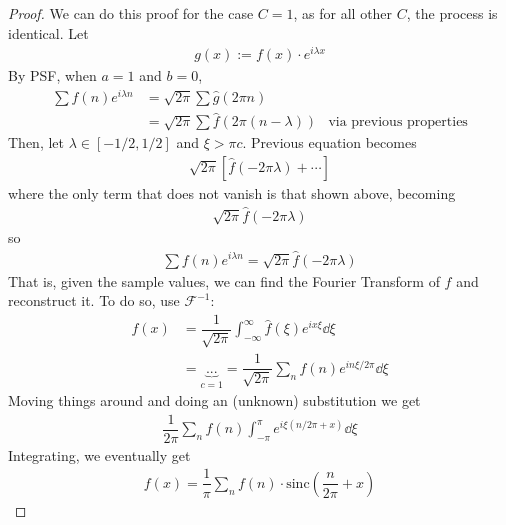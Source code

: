 \begin{proof}
    We can do this proof for the case $C=1$, as for all other $C$, the process is identical. Let
    \begin{align}
        g(x) := f(x) \cdot e^{i\lambda x}    
    \end{align}
    By PSF, when $a=1$ and $b=0$,
    \begin{align}
        \sum f(n) e^{i\lambda n} &= \sqrt{2\pi} \sum \hat{g}(2\pi n)\\
        &= \sqrt{2\pi} \sum \hat{f}(2\pi (n-\lambda)) & \text{via previous properties}
    \end{align}
    Then, let $\lambda \in [-1/2, 1/2]$ and $\xi > \pi c$. Previous equation becomes
    \begin{align}
        \sqrt{2\pi}\left[ \hat{f}(-2\pi \lambda) + \cdots \right]
    \end{align}
    where the only term that does not vanish is that shown above, becoming
    \begin{align}
        \sqrt{2\pi} \hat{f}(-2\pi \lambda)
    \end{align}
    so
    \begin{align}
        \sum f(n) e^{i\lambda n} = \sqrt{2\pi} \hat{f}(-2\pi\lambda)
    \end{align}
    That is, given the sample values, we can find the Fourier Transform of $f$ and reconstruct it. To do so, use $\mathcal{F}^{-1}$:
    \begin{align}
        f(x) &= \dfrac{1}{\sqrt{2\pi}} \int_{-\infty}^\infty \hat{f}(\xi) e^{ix\xi} \dd{\xi}\\
        &= \underbrace{...}_{c=1} = \dfrac{1}{\sqrt{2\pi}} \sum_n f(n) e^{in\xi/2\pi} \dd{\xi}
    \end{align}
    Moving things around and doing an (unknown) substitution we get
    \begin{align}
        \dfrac{1}{2\pi} \sum_n f(n) \int_{-\pi}^\pi e^{i\xi (n/2\pi + x)} \dd{\xi}
    \end{align}
    Integrating, we eventually get
    \begin{align}
        \boxed{f(x) = \dfrac{1}{\pi} \sum_n f(n) \cdot \text{sinc}(\dfrac{n}{2\pi} + x)}
    \end{align}
\end{proof}